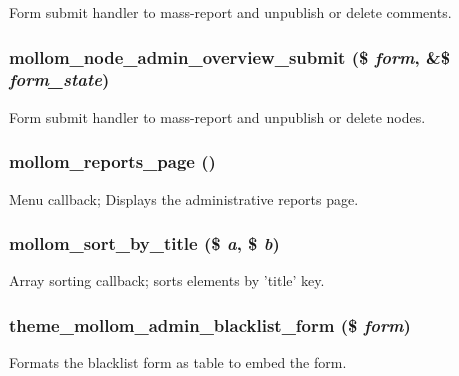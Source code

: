Form submit handler to mass-report and unpublish or delete comments. \hypertarget{mollom_8admin_8inc_c3a31b646ec25bf37f2b4723b991b487}{
\subsubsection[{mollom\_\-node\_\-admin\_\-overview\_\-submit}]{\setlength{\rightskip}{0pt plus 5cm}mollom\_\-node\_\-admin\_\-overview\_\-submit (\$ {\em form}, \/  \&\$ {\em form\_\-state})}}
\label{mollom_8admin_8inc_c3a31b646ec25bf37f2b4723b991b487}


Form submit handler to mass-report and unpublish or delete nodes. \hypertarget{mollom_8admin_8inc_e261b31f0d3924e898b4603eec0d5dad}{
\subsubsection[{mollom\_\-reports\_\-page}]{\setlength{\rightskip}{0pt plus 5cm}mollom\_\-reports\_\-page ()}}
\label{mollom_8admin_8inc_e261b31f0d3924e898b4603eec0d5dad}


Menu callback; Displays the administrative reports page. \hypertarget{mollom_8admin_8inc_e16b9fc7502f49e8a09771ce2566053b}{
\subsubsection[{mollom\_\-sort\_\-by\_\-title}]{\setlength{\rightskip}{0pt plus 5cm}mollom\_\-sort\_\-by\_\-title (\$ {\em a}, \/  \$ {\em b})}}
\label{mollom_8admin_8inc_e16b9fc7502f49e8a09771ce2566053b}


Array sorting callback; sorts elements by 'title' key. \hypertarget{mollom_8admin_8inc_d9c477f6506780058c78ce26e7c7faf2}{
\subsubsection[{theme\_\-mollom\_\-admin\_\-blacklist\_\-form}]{\setlength{\rightskip}{0pt plus 5cm}theme\_\-mollom\_\-admin\_\-blacklist\_\-form (\$ {\em form})}}
\label{mollom_8admin_8inc_d9c477f6506780058c78ce26e7c7faf2}


Formats the blacklist form as table to embed the form. 